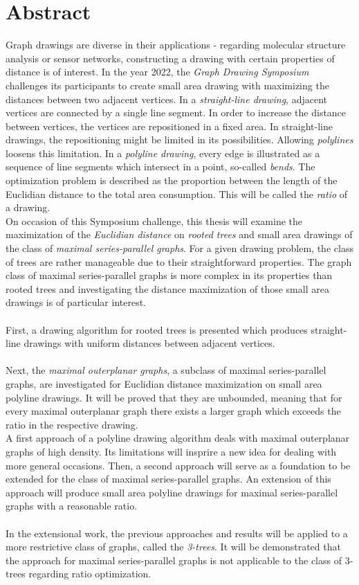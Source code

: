 \section*{Abstract}
Graph drawings are diverse in their applications - regarding molecular structure analysis or sensor networks, constructing a drawing with certain properties of distance is of interest. In the year 2022, the \emph{Graph Drawing Symposium} challenges its participants to create small area drawing with maximizing the distances between two adjacent vertices. In a \emph{straight-line drawing}, adjacent vertices are connected by a single line segment. In order to increase the distance between vertices, the vertices are repositioned in a fixed area. In straight-line drawings, the repositioning might be limited in its possibilities. 
Allowing \emph{polylines} loosens this limitation. In a \emph{polyline drawing}, every edge is illustrated as a sequence of line segments which intersect in a point, so-called \textit{bends}. The optimization problem is described as the proportion between the length of the Euclidian distance to the total area consumption. This will be called the \emph{ratio} of a drawing.
\\
On occasion of this Symposium challenge, this thesis will examine the maximization of the \emph{Euclidian distance} on \emph{rooted trees} and small area drawings of the class of \emph{maximal series-parallel graphs}. For a given drawing problem, the class of trees are rather manageable due to their straightforward properties. The graph class of maximal series-parallel graphs is more complex in its properties than rooted trees and investigating the distance maximization of those small area drawings is of particular interest.
\\\\
First, a drawing algorithm for rooted trees is presented which produces straight-line drawings with uniform distances between adjacent vertices.\\\\
Next, the \emph{maximal outerplanar graphs}, a subclass of maximal series-parallel graphs, are investigated for Euclidian distance maximization on small area polyline drawings. It will be proved that they are unbounded, meaning that for every maximal outerplanar graph there exists a larger graph which exceeds the ratio in the respective drawing.\\
A first approach of a polyline drawing algorithm deals with maximal outerplanar graphs of high density. Its limitations will insprire a new idea for dealing with more general occasions. Then, a second approach will serve as a foundation to be extended for the class of maximal series-parallel graphs. An extension of this approach will produce small area polyline drawings for maximal series-parallel graphs with a reasonable ratio.
\\\\
In the extensional work, the previous approaches and results will be applied to a more restrictive class of graphs, called the \emph{3-trees}. It will be demonstrated that the approach for maximal series-parallel graphs is not applicable to the class of 3-trees regarding ratio optimization. 